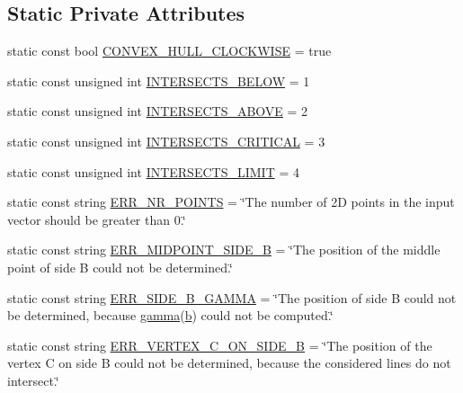 \subsection*{Static Private Attributes}
\begin{DoxyCompactItemize}
\item 
static const bool \hyperlink{classmultiscale_1_1MinEnclosingTriangleFinder_a951b35e4f359e61301deb0840abea51a}{C\-O\-N\-V\-E\-X\-\_\-\-H\-U\-L\-L\-\_\-\-C\-L\-O\-C\-K\-W\-I\-S\-E} = true
\item 
static const unsigned int \hyperlink{classmultiscale_1_1MinEnclosingTriangleFinder_ab3251c940d6ca18e9339d1d168390ab6}{I\-N\-T\-E\-R\-S\-E\-C\-T\-S\-\_\-\-B\-E\-L\-O\-W} = 1
\item 
static const unsigned int \hyperlink{classmultiscale_1_1MinEnclosingTriangleFinder_ab44440be62a75f528ccc11753ce66b52}{I\-N\-T\-E\-R\-S\-E\-C\-T\-S\-\_\-\-A\-B\-O\-V\-E} = 2
\item 
static const unsigned int \hyperlink{classmultiscale_1_1MinEnclosingTriangleFinder_a55ae42aad114fcd3d1b17ae181e3cdfb}{I\-N\-T\-E\-R\-S\-E\-C\-T\-S\-\_\-\-C\-R\-I\-T\-I\-C\-A\-L} = 3
\item 
static const unsigned int \hyperlink{classmultiscale_1_1MinEnclosingTriangleFinder_a2d3db503338bc7b70a2e7122eb5b13e3}{I\-N\-T\-E\-R\-S\-E\-C\-T\-S\-\_\-\-L\-I\-M\-I\-T} = 4
\item 
static const string \hyperlink{classmultiscale_1_1MinEnclosingTriangleFinder_af42f92155e17b69fc5b309dfcf160ad7}{E\-R\-R\-\_\-\-N\-R\-\_\-\-P\-O\-I\-N\-T\-S} = \char`\"{}The number of 2\-D points in the input vector should be greater than 0.\char`\"{}
\item 
static const string \hyperlink{classmultiscale_1_1MinEnclosingTriangleFinder_a39758a67f9d66d46f128f23fa7027d68}{E\-R\-R\-\_\-\-M\-I\-D\-P\-O\-I\-N\-T\-\_\-\-S\-I\-D\-E\-\_\-\-B} = \char`\"{}The position of the middle point of side B could not be determined.\char`\"{}
\item 
static const string \hyperlink{classmultiscale_1_1MinEnclosingTriangleFinder_a84e5ff8e5fec501f3d3b9ac6ee2416ee}{E\-R\-R\-\_\-\-S\-I\-D\-E\-\_\-\-B\-\_\-\-G\-A\-M\-M\-A} = \char`\"{}The position of side B could not be determined, because \hyperlink{classmultiscale_1_1MinEnclosingTriangleFinder_a800413be1e1567d986a92fac4a6b937e}{gamma}(\hyperlink{classmultiscale_1_1MinEnclosingTriangleFinder_a71355f44126b38a4fb55c0c92ab64816}{b}) could not be computed.\char`\"{}
\item 
static const string \hyperlink{classmultiscale_1_1MinEnclosingTriangleFinder_a8e551d77bc36b7696ea969823f5720d1}{E\-R\-R\-\_\-\-V\-E\-R\-T\-E\-X\-\_\-\-C\-\_\-\-O\-N\-\_\-\-S\-I\-D\-E\-\_\-\-B} = \char`\"{}The position of the vertex C on side B could not be determined, because the considered lines do not intersect.\char`\"{}

\end{DoxyCompactItemize}
